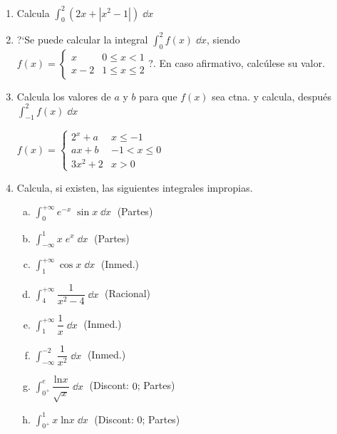 \begin{enumerate}
\item Calcula $\displaystyle \int_0^2 \left( 2x+|x^2-1| \right)\; \dd x$

\rightline{\textcolor{gris}{Sol: $6$ }}


\item ?`Se puede calcular la integral $\displaystyle \int_0^2 f(x)\; \dd x$, siendo $f(x)=\begin{cases}
x & 0\le x < 1 \\
x-2 & 1\le x \le 2	
\end{cases}$?. En caso afirmativo, calcúlese su valor.

\rightline{\textcolor{gris}{Sol: Si, $\; 0$ }}


\item Calcula los valores de $a$ y $b$ para que $f(x)$ sea ctna. y calcula, después $\displaystyle \int_{-1}^2 f(x) \; \dd x$

\hspace{10mm} $f(x)=\begin{cases}
2^x+a & x\le -1 \\ 	ax+b & -1<x\le 0 \\ 3x^2+2 & x>0
\end{cases}$


\rightline{\textcolor{gris}{Sol: $\; a=3/4;\quad b=2; \quad integral=-109/8$ }} 


\item Calcula, si existen, las siguientes integrales impropias.
\begin{multicols}{2}
\begin{enumerate}[a) ]
\item $\displaystyle \int_{0}^{+\infty} e^{-x}\; \sin x \; \dd x\; $ (Partes)
\item $\displaystyle \int_{-\infty}^1{} x\; e^x \;  \dd x\; $ (Partes)
\item $\displaystyle \int_{1}^{+\infty} \cos x \;  \dd x\; $ (Inmed.)
\item $\displaystyle \int_{4}^{+\infty} \dfrac {1}{x^2-4}\;  \dd x\; $ (Racional)
\item $\displaystyle \int_{1}^{+\infty} \dfrac 1 x \;  \dd x\; $ (Inmed.)
\item $\displaystyle \int_{-\infty}^{-2} \dfrac 1 {x^2} \;  \dd x\; $ (Inmed.)
\item $\displaystyle \int_{0^+}^{e} \dfrac {\mathrm{ln} x}{\sqrt{x}} \;  \dd x\; $ (Discont: $0$; Partes)
\item $\displaystyle \int_{0^+}^{1} x\; \mathrm{ln} x \;  \dd x\; $ (Discont: $0$; Partes)
\end{enumerate}	
\end{multicols}


\end{enumerate}
